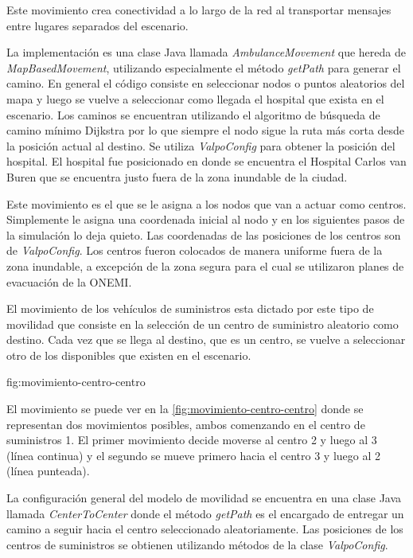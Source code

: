 Este movimiento crea conectividad a lo largo de la red al transportar mensajes
entre lugares separados del escenario.


La implementación es una clase Java llamada \textit{AmbulanceMovement} que
hereda de \textit{MapBasedMovement}, utilizando especialmente el método
\textit{getPath} para generar el camino. En general el código consiste en
seleccionar nodos o puntos aleatorios del mapa y luego se vuelve a seleccionar
como llegada el hospital que exista en el escenario. Los caminos se encuentran
utilizando el algoritmo de búsqueda de camino mínimo Dijkstra
\cite{Dijkstra1959} por lo que siempre el nodo sigue la ruta más corta desde la
posición actual al destino. Se utiliza \textit{ValpoConfig} para obtener la
posición del hospital. El hospital fue posicionado en donde se encuentra el
Hospital Carlos van Buren que se encuentra justo fuera de la zona inundable de
la ciudad.




Este movimiento es el que se le asigna a los nodos que van a actuar como
centros. Simplemente le asigna una coordenada inicial al nodo y en los
siguientes pasos de la simulación lo deja quieto. Las coordenadas de
las posiciones de los centros son de \textit{ValpoConfig}. Los centros fueron
colocados de manera uniforme fuera de la zona inundable, a excepción de la zona
segura para el cual se utilizaron planes de evacuación de la ONEMI.




El movimiento de los vehículos de suministros esta dictado por este tipo de
movilidad que consiste en la selección de un centro de suministro aleatorio como
destino. Cada vez que se llega al destino, que es un centro, se vuelve a
seleccionar otro de los disponibles que existen en el escenario.


{}{fig:movimiento-centro-centro}

El movimiento se puede ver en la \ref{fig:movimiento-centro-centro} donde se
representan dos movimientos posibles, ambos comenzando en el centro de
suministros 1. El primer movimiento decide moverse al centro 2 y luego al 3
(línea continua) y el segundo se mueve primero hacia el centro 3 y luego al 2
(línea punteada).

La configuración general del modelo de movilidad se encuentra en una clase Java
llamada \textit{CenterToCenter} donde el método \textit{getPath} es el encargado
de entregar un camino a seguir hacia el centro seleccionado aleatoriamente. Las
posiciones de los centros de suministros se obtienen utilizando métodos de la
clase \textit{ValpoConfig}.

